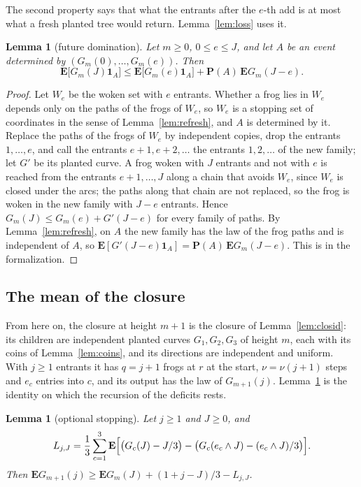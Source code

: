 \documentclass[11pt]{amsart}
\newtheorem{lemma}[theorem]{Lemma}
\theoremstyle{definition}
\numberwithin{equation}{section}
\newcommand{\lean}[1]{\ignorespaces}
\newcommand{\E}{\mathbf{E}}
\renewcommand{\P}{\mathbf{P}}
\newcommand{\one}{\mathbf{1}}
\begin{document}
The second property says that what the entrants after the $e$-th add is at most what a fresh planted tree would return. Lemma~\ref{lem:loss} uses it.

\begin{lemma}[future domination]\label{lem:future}\lean{FrogModel.D3.LaneA.future_dom_proof, FrogModel.D3.Iface.future_dom}
Let $m\ge0$, $0\le e\le J$, and let $A$ be an event determined by $(G_m(0),\dots,G_m(e))$. Then
\[
\E\bigl[G_m(J)\one_A\bigr]\le\E\bigl[G_m(e)\one_A\bigr]+\P(A)\,\E G_m(J-e).
\]
\end{lemma}

\begin{proof}
Let $W_e$ be the woken set with $e$ entrants. Whether a frog lies in $W_e$ depends only on the paths of the frogs of $W_e$, so $W_e$ is a stopping set of coordinates in the sense of Lemma~\ref{lem:refresh}, and $A$ is determined by it. Replace the paths of the frogs of $W_e$ by independent copies, drop the entrants $1,\dots,e$, and call the entrants $e+1,e+2,\dots$ the entrants $1,2,\dots$ of the new family; let $G'$ be its planted curve. A frog woken with $J$ entrants and not with $e$ is reached from the entrants $e+1,\dots,J$ along a chain that avoids $W_e$, since $W_e$ is closed under the arcs; the paths along that chain are not replaced, so the frog is woken in the new family with $J-e$ entrants. Hence $G_m(J)\le G_m(e)+G'(J-e)$ for every family of paths. By Lemma~\ref{lem:refresh}, on $A$ the new family has the law of the frog paths and is independent of $A$, so $\E[G'(J-e)\one_A]=\P(A)\,\E G_m(J-e)$. This is  in the formalization.
\end{proof}

\subsection*{The mean of the closure}
From here on, the closure at height $m+1$ is the closure of Lemma~\ref{lem:closid}: its children are independent planted curves $G_1,G_2,G_3$ of height $m$, each with its coins of Lemma~\ref{lem:coins}, and its directions are independent and uniform. With $j\ge1$ entrants it has $q=j+1$ frogs at $r$ at the start, $\nu=\nu(j+1)$ steps and $e_c$ entries into $c$, and its output has the law of $G_{m+1}(j)$. Lemma~\ref{lem:D1} is the identity on which the recursion of the deficits rests.

\begin{lemma}[optional stopping]\label{lem:D1}\lean{FrogModel.D3.Assembly.d1_proof, FrogModel.D3.Iface.d1, FrogModel.D3.Iface.lossL}
Let $j\ge1$ and $J\ge0$, and
\[
L_{j,J}=\frac13\sum_{c=1}^3\E\Bigl[\bigl(G_c(J)-J/3\bigr)-\bigl(G_c(e_c\wedge J)-(e_c\wedge J)/3\bigr)\Bigr].
\]
Then $\E G_{m+1}(j)\ge\E G_m(J)+(1+j-J)/3-L_{j,J}$.
\end{lemma}
\end{document}
